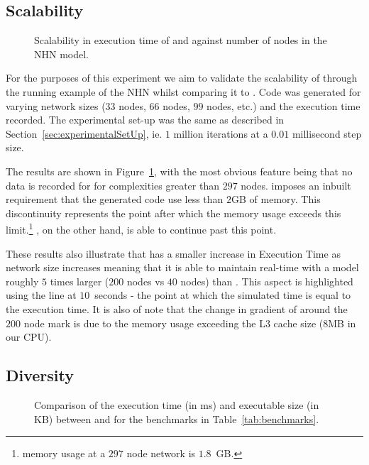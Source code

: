 \subsection{Scalability}

\begin{figure}[htbp]
  \centering
  
  \caption{Scalability in  execution time of \simulink and \ourTool against 
  number of nodes in the \acf{NHN} model.}
  \label{fig:scalability}
\end{figure}

For the purposes of this experiment we aim to validate the scalability of
\ourTool through the running example of the \ac{NHN} whilst comparing it
to \simulink.  Code was generated for varying network sizes ($33$ nodes,
$66$ nodes, $99$ nodes, etc.) and the execution time recorded.  The
experimental set-up was the same as described in
Section~\ref{sec:experimentalSetUp}, ie. $1$ million iterations at a
$0.01$ millisecond step size.

The results are shown in Figure~\ref{fig:scalability}, with the most
obvious feature being that no data is recorded for \simulink for
complexities greater than $297$ nodes.  \simulink imposes an inbuilt
requirement that the generated code use less than $2$GB of memory. This
discontinuity represents the point after which the memory usage exceeds
this limit.\footnote{\simulink memory usage at a $297$ node network is 
$1.8$~GB.}  \ourTool, on the other hand, is able to continue past this
point.

These results also illustrate that \ourTool has a smaller increase in
Execution Time as network size increases meaning that it is able to
maintain real-time with a model roughly $5$ times larger ($200$ nodes vs
$40$ nodes) than \simulink.  This aspect is highlighted using the line at 
$10$~seconds - the point at which the simulated time is equal to the execution 
time.  It is also of note that the change in gradient of \ourTool around the 
$200$ node mark is due to the memory usage exceeding the L$3$ cache size ($8$MB 
in our CPU).


\subsection{Diversity}
\label{sec:diversity}

\begin{figure}[htbp]
  \centering
  \caption{Comparison of the execution time (in ms) and executable size
    (in KB) between \simulink and \ourTool for the benchmarks in
    Table~\ref{tab:benchmarks}.}
  \label{fig:results}
\end{figure}

